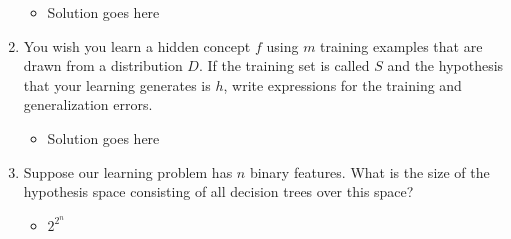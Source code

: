 \documentclass{article}
\begin{document}
\begin{enumerate}
	\begin{itemize}
	\item Solution goes here
	\end{itemize}



\item You wish you learn a hidden concept $f$ using $m$ training examples that are drawn from a distribution $D$. If the training set is called $S$ and the hypothesis that your learning generates is $h$, write expressions for the training and generalization errors.

	\begin{itemize}
	\item Solution goes here
	\end{itemize}




\item Suppose our learning problem has $n$ binary features. What is the size of the hypothesis space consisting of all decision trees over this space?
	\begin{itemize}
	\item $2^{2^{n}}$
	\end{itemize}

\end{enumerate}
\end{document}
